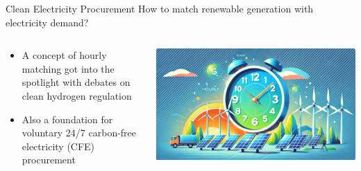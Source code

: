 \begin{frame}{Clean Electricity Procurement}
	\vspace{-1cm}
	\centering
	How to \alert{match} renewable generation with electricity demand?
	\vspace{0.5cm}
	  \begin{columns}
		\begin{column}{0.4\textwidth}
		\begin{itemize}
			\item A concept of \alert{hourly matching} got into the spotlight with debates on clean hydrogen regulation
			\item Also a foundation for voluntary 24/7 carbon-free electricity (CFE) procurement  
		\end{itemize}      
		\end{column}
		\begin{column}{0.6\textwidth}
			\includegraphics[width=1\linewidth]{images/hourly_electricity_procurement_v2}  
		\end{column}
	\end{columns}
\end{frame}
